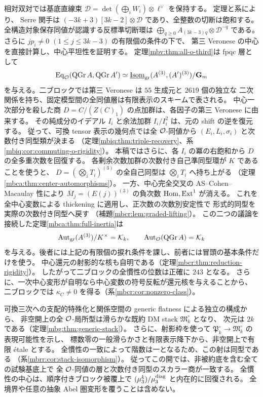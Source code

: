 相対双対では基底直線束
$\mathscr D=\det(\bigoplus_iW_i)\otimes\ell^\vee$ を保持する。
定理と系により、
Serre 関手は $(-3k+3)[3k-2]\otimes\mathscr D$ であり、全整数の切断は飽和する。
全構造対象保存同値が認識する反標準切断環は
$\bigoplus_{q\geq0}A_{(3k-3)q}\otimes\mathscr D^{-q}$ である。
さらに $jp_i\ne0$ $(1\leq j\leq3k-3)$ の有限個の条件の下で、
第三 Veronese の中心を直接計算し、中心平坦性を証明する。
定理\ref{mbv:thm:all-o-third}は fpqc 層として
\[
 \operatorname{Eq}_{\mathcal O}(\operatorname{QGr}A,\operatorname{QGr}A')
 \simeq
 \underline{\operatorname{Isom}}_{\rm gr}(A^{(3)},(A')^{(3)})/\mathbf G_m
\]
を与える。二ブロックでは第三 Veronese は $55$ 生成元と $2619$ 個の独立な
二次関係を持ち、固定模型間の全同値層は有限表示のスキームで表される。
中心一次部分を殺した商 $D=C/(Z(C)_1)$ の点加群は、各因子の第三 Veronese に由来する。
その純成分のイデアル $I_i$ と余法加群 $I_i/I_i^2$ は、元の shift の逆を復元する。
従って、可換 tensor 表示の幾何点では全 $\mathcal O$-同値から
$(E_i,L_i,\sigma_i)$ と次数付き同型類が決まる
（定理\ref{mbiq:thm:triple-recovery}、系\ref{mbiq:cor:commuting-o-rigidity}）。
本稿ではさらに、各 $I_i$ の冪の右飽和から $D$ の全多重次数を回復する。
各剰余次数加群の次数付き自己準同型環が $K$ であることを使うと、
$D=(\bigotimes_iT_i)^{(3)}$ の全自己同型は $\bigotimes_iT_i$ へ持ち上がる
（定理\ref{mbca:thm:center-automorphisms}）。
一方、中心完全交叉の AS--Cohen--Macaulay 性により
$\overline M_j=(E(j))^{(3)}$ の負次数 $\operatorname{Hom},\operatorname{Ext}^1$ が消える。
これを全中心変数による thickening に適用し、正次数の次数別安定性で
形式的同型を実際の次数付き同型へ戻す
（補題\ref{mbcr:lem:graded-lifting}）。
この二つの議論を接続した定理\ref{mbca:thm:full-inertia}は
\[
 \operatorname{Aut}_{\rm gr}(A^{(3)})/K^\times=\mathcal K_k,
 \qquad
 \operatorname{Aut}_{\mathcal O}(\operatorname{QGr} A)=\mathcal K_k
\]
を与える。後者には上記の有限個の捩れ条件を課し、前者には冒頭の基本条件だけを使う。
中心還元の射影的な核も自明である（定理\ref{mbcr:thm:reduction-rigidity}）。
したがって二ブロックの全慣性の位数は正確に $243$ となる。
さらに、一次中心変形が自明なら中心変数の符号反転が還元核を与えることから、
二ブロックでは $\kappa_C\ne0$ を得る（系\ref{mbcr:cor:nonzero-class}）。

可換三次への支配的特殊化と関係空間の generic flatness による独立の構成から、
非空開上の全 $\mathcal O$-局所型は滑らかな既約 DM stack $\mathfrak M_k^\circ$ となり、
次元は $2k$ である（定理\ref{mbg:thm:generic-stack}）。
さらに、射影枠を使って $\mathfrak P_k^\circ\to\mathfrak M_k^\circ$ の表現可能性を示し、
標数零の一般滑らかさと有限表示降下から、非空開上で有限 \'etale とする。
全慣性の一致によって階数は一となるため、この射は同型である
（系\ref{mbrr:cor:stack-isomorphism}）。
従ってこの開では、非被約底を含む全ての試験基底上で
全 $\mathcal O$-同値の層と次数付き同型のスカラー商が一致する。
全慣性の中心は、順序付きブロック被覆上で
$(\mu_3^k)/\mu_3^{\rm diag}$ と内在的に回復される。
全境界や任意の抽象 Abel 圏変形を覆うことは含めない。

